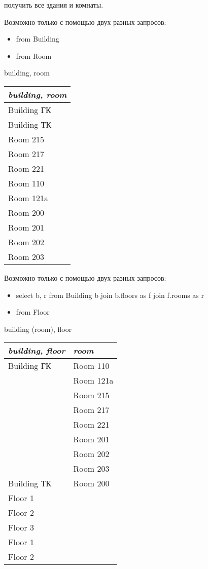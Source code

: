 \exastable
    {получить все здания и комнаты.}
    {Возможно только с помощью двух разных запросов:
	\begin{itemize}\addtolength{\itemsep}{-0.7\baselineskip}
	    \item from Building
	    \item from Room
	\end{itemize}}
    {building, room}
    {\begin{tabular}{|l|}
	\hline
	\it{building, room}\\[5pt]
	\hline
	\hline
	Building ГК\\
	\hline
	Building ТК\\
	\hline
	Room 215\\
	\hline
	Room 217\\
	\hline
	Room 221\\
	\hline
	Room 110\\
	\hline
	Room 121a\\
	\hline
	Room 200\\
	\hline
	Room 201\\
	\hline
	Room 202\\
	\hline
	Room 203\\
	\hline
    \end{tabular}}

    {Возможно только с помощью двух разных запросов:
	\begin{itemize}\addtolength{\itemsep}{-0.7\baselineskip}
	    \item select b, r from Building b join b.floors as f join f.rooms as r
	    \item from Floor
	\end{itemize}}
    {building (room), floor}
    {\begin{tabular}{|l|l|}
	\hline
	\it{building, floor} & \it{room} \\[5pt]
	\hline
	\hline
	Building ГК & Room 110\\
	\cline{2-2}
		    & Room 121a\\
	\cline{2-2}
		    & Room 215\\
	\cline{2-2}
		    & Room 217\\
	\cline{2-2}
		    & Room 221\\
	\cline{2-2}
		    & Room 201\\
	\cline{2-2}
		    & Room 202\\
	\cline{2-2}
		    & Room 203\\
	\hline
	Building ТК & Room 200\\	
	\hline
	Floor 1 & \\
	\hline
	Floor 2 & \\
	\hline
	Floor 3 & \\
	\hline
	Floor 1 & \\
	\hline
	Floor 2 & \\
	\hline
    \end{tabular}}

